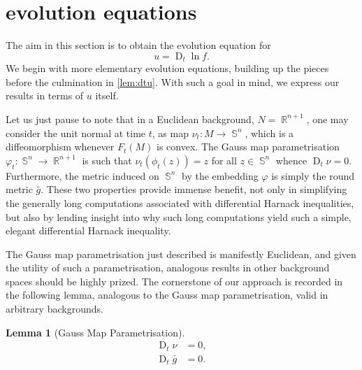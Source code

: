 \documentclass{amsart}
\newtheorem{lemma}[theorem]{Lemma}
\theoremstyle{definition}
\theoremstyle{remark}
\DeclareMathOperator{\D}{D}
\DeclareMathOperator{\RR}{\mathbb{R}}
\DeclareMathOperator{\sphere}{\mathbb{S}}
\numberwithin{equation}{section}
\begin{document}
\section{evolution equations}


The aim in this section is to obtain the evolution equation for
\[
u = \D_t \ln f.
\]
We begin with more elementary evolution equations, building up the pieces before the culmination in \cref{lem:dtu}. With such a goal in mind, we express our results in terms of $u$ itself.

Let us just pause to note that in a Euclidean background, $N = \RR^{n+1}$, one may consider the unit normal at time $t$, as map $\nu_t : M \to \sphere^n$, which is a diffeomorphism whenever $F_t(M)$ is convex. The Gauss map parametrisation $\varphi_t: \sphere^n \to \RR^{n+1}$ \cite{MR1296393} is such that $\nu_t(\phi_t(z)) = z$ for all $z \in \sphere^n$ whence $\D_t \nu = 0$. Furthermore, the metric induced on $\sphere^n$ by the embedding $\varphi$ is simply the round metric $\bar{g}$. These two properties provide immense benefit, not only in simplifying the generally long computations associated with differential Harnack inequalities, but also by lending insight into why such long computations yield such a simple, elegant differential Harnack inequality.

The Gauss map parametrisation just described is manifestly Euclidean, and given the utility of such a parametrisation, analogous results in other background spaces should be highly prized. The cornerstone of our approach is recorded in the following lemma, analogous to the Gauss map parametrisation, valid in arbitrary backgrounds.

\begin{lemma}[Gauss Map Parametrisation]
\label{lem:gaussmap}
\begin{align}
\D_t \nu & = 0, \\
\D_t \bar{g} &= 0.
\end{align}
\end{lemma}
\end{document}
